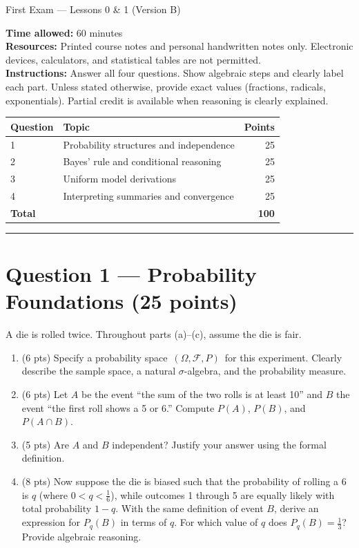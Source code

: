 \documentclass[11pt]{article}
\begin{document}
\begin{center}
{\LARGE First Exam — Lessons 0 \& 1 (Version B)}\\[0.75em]
\end{center}

\noindent\textbf{Time allowed:} 60 minutes\\
\textbf{Resources:} Printed course notes and personal handwritten notes only. Electronic devices, calculators, and statistical tables are not permitted.\\
\textbf{Instructions:} Answer all four questions. Show algebraic steps and clearly label each part. Unless stated otherwise, provide exact values (fractions, radicals, exponentials). Partial credit is available when reasoning is clearly explained.

\vspace{0.75em}
\noindent\begin{tabular}{@{}p{2.2cm}p{8.2cm}r@{}}
\toprule
\textbf{Question} & \textbf{Topic} & \textbf{Points}\\
\midrule
1 & Probability structures and independence & 25\\
2 & Bayes' rule and conditional reasoning & 25\\
3 & Uniform model derivations & 25\\
4 & Interpreting summaries and convergence & 25\\
\midrule
\textbf{Total} & & \textbf{100}\\
\bottomrule
\end{tabular}

\vspace{1em}
\hrule
\vspace{1em}

\section*{Question 1 — Probability Foundations (25 points)}

A die is rolled twice. Throughout parts (a)–(c), assume the die is fair.

\begin{enumerate}
  \item (6 pts) Specify a probability space $\,(\Omega, \mathcal{F}, P)\,$ for this experiment. Clearly describe the sample space, a natural $\sigma$-algebra, and the probability measure.
  \item (6 pts) Let $A$ be the event ``the sum of the two rolls is at least 10'' and $B$ the event ``the first roll shows a 5 or 6.'' Compute $P(A)$, $P(B)$, and $P(A \cap B)$.
  \item (5 pts) Are $A$ and $B$ independent? Justify your answer using the formal definition.
  \item (8 pts) Now suppose the die is biased such that the probability of rolling a 6 is $q$ (where $0 < q < \tfrac{1}{6}$), while outcomes 1 through 5 are equally likely with total probability $1-q$. With the same definition of event $B$, derive an expression for $P_q(B)$ in terms of $q$. For which value of $q$ does $P_q(B) = \tfrac{1}{3}$? Provide algebraic reasoning.
\end{enumerate}
\end{document}

